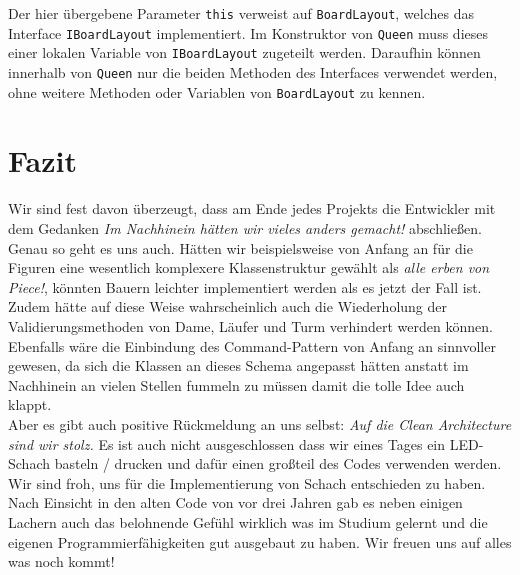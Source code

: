 \documentclass[
10pt, %
a4paper, %
oneside, %
headinclude,footinclude, %
BCOR5mm, %
]{scrartcl}
\begin{document}
\begin{onehalfspace}
Der hier übergebene Parameter \texttt{this} verweist auf \texttt{BoardLayout}, welches das Interface \texttt{IBoardLayout} implementiert. Im Konstruktor von \texttt{Queen} muss dieses einer lokalen Variable von \texttt{IBoardLayout} zugeteilt werden. Daraufhin können innerhalb von \texttt{Queen} nur die beiden Methoden des Interfaces verwendet werden, ohne weitere Methoden oder Variablen von \texttt{BoardLayout} zu kennen. 

\newpage
\section{Fazit}
\label{sec:end}

Wir sind fest davon überzeugt, dass am Ende jedes Projekts die Entwickler mit dem Gedanken \textit{Im Nachhinein hätten wir vieles anders gemacht!} abschließen. Genau so geht es uns auch. Hätten wir beispielsweise von Anfang an für die Figuren eine wesentlich komplexere Klassenstruktur gewählt als \textit{alle erben von Piece!}, könnten Bauern leichter implementiert werden als es jetzt der Fall ist. Zudem hätte auf diese Weise wahrscheinlich auch die Wiederholung der Validierungsmethoden von Dame, Läufer und Turm verhindert werden können. \\
Ebenfalls wäre die Einbindung des Command-Pattern von Anfang an sinnvoller gewesen, da sich die Klassen an dieses Schema angepasst hätten anstatt im Nachhinein an vielen Stellen fummeln zu müssen damit die tolle Idee auch klappt. \\
Aber es gibt auch positive Rückmeldung an uns selbst: \textit{Auf die Clean Architecture sind wir stolz.} Es ist auch nicht ausgeschlossen dass wir eines Tages ein LED-Schach basteln / drucken und dafür einen großteil des Codes verwenden werden.\\
Wir sind froh, uns für die Implementierung von Schach entschieden zu haben. Nach Einsicht in den alten Code von vor drei Jahren gab es neben einigen Lachern auch das belohnende Gefühl wirklich was im Studium gelernt und die eigenen Programmierfähigkeiten gut ausgebaut zu haben. Wir freuen uns auf alles was noch kommt!


\end{onehalfspace}
\end{document}
